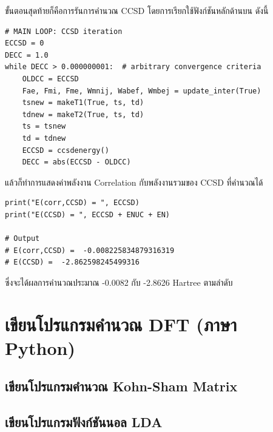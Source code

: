 \vspace{5pt}

\noindent ขั้นตอนสุดท้ายก็คือการรันการคำนวณ CCSD โดยการเรียกใช้ฟังก์ชันหลักด้านบน ดังนี้

\vspace{5pt}

\begin{lstlisting}[style=MyPython]
# MAIN LOOP: CCSD iteration
ECCSD = 0
DECC = 1.0
while DECC > 0.000000001:  # arbitrary convergence criteria
    OLDCC = ECCSD
    Fae, Fmi, Fme, Wmnij, Wabef, Wmbej = update_inter(True)
    tsnew = makeT1(True, ts, td)
    tdnew = makeT2(True, ts, td)
    ts = tsnew
    td = tdnew
    ECCSD = ccsdenergy()
    DECC = abs(ECCSD - OLDCC)
\end{lstlisting}

\vspace{5pt}

\noindent แล้วก็ทำการแสดงค่าพลังงาน Correlation กับพลังงานรวมของ CCSD ที่คำนวณได้

\vspace{5pt}

\begin{lstlisting}[style=MyPython]
print("E(corr,CCSD) = ", ECCSD)
print("E(CCSD) = ", ECCSD + ENUC + EN)

# Output
# E(corr,CCSD) =  -0.008225834879316319
# E(CCSD) =  -2.862598245499316
\end{lstlisting}

\vspace{5pt}

\noindent ซึ่งจะได้ผลการคำนวณประมาณ -0.0082 กับ -2.8626 Hartree ตามลำดับ

\vspace{5pt}

\section{เขียนโปรแกรมคำนวณ DFT (ภาษา Python)}

\subsection{เขียนโปรแกรมคำนวณ Kohn-Sham Matrix}

\subsection{เขียนโปรแกรมฟังก์ชันนอล LDA}

